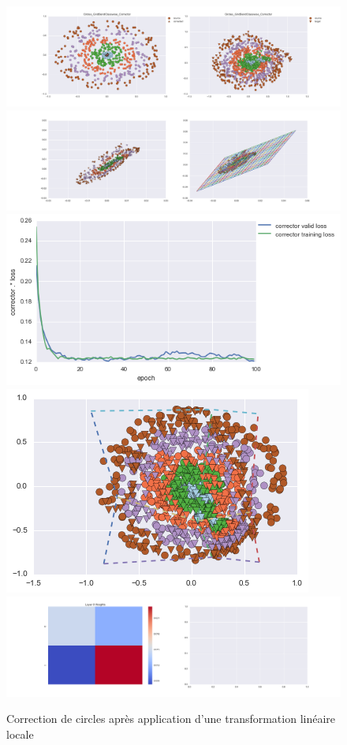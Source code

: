 \begin{figure}[H] %
\centering
\includegraphics[width=\linewidth]{fig/24-05-2016/circles/Circles_GridBendClasswise_Corrector-DATA.png}
\includegraphics[width=\linewidth]{fig/24-05-2016/circles/Circles_GridBendClasswise_Corrector-GridCheck.png}
\includegraphics[width=0.45\linewidth]{fig/24-05-2016/circles/Circles_GridBendClasswise_Corrector-Learning_curve.png}
\includegraphics[width=0.45\linewidth]{fig/24-05-2016/circles/circles_grid.png}
\includegraphics[width=\linewidth]{fig/24-05-2016/circles/Circles_GridBendClasswise_Corrector-W.png}
\caption{Correction de circles après application d'une transformation linéaire locale}
\label{fig:recap-circles-GridBend-classwise}
\end{figure}



